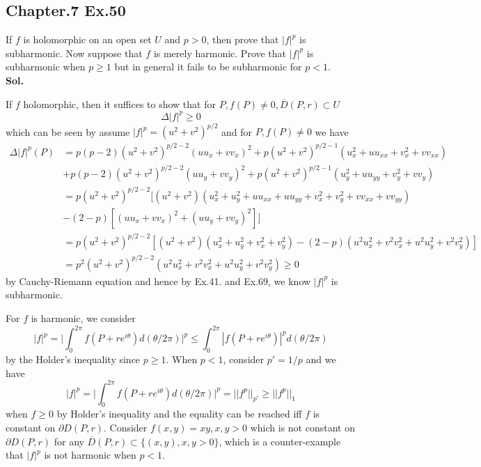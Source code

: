 \documentclass[lang=en,11pt,a4paper,citestyle =authoryear]{elegantpaper}
\begin{document}
\subsection*{Chapter.7 Ex.50} 
If $f$ is holomorphic on an open set $U$ and $p>0$, then prove that $|f|^p$ is subharmonic. Now suppose that $f$ is merely harmonic. Prove that $|f|^p$ is subharmonic when $p\geq 1$ but in general it fails to be subharmonic for $p<1$.
\vspace{0.5em}\\
\textbf{Sol.} \par
If $f$ holomorphic, then it suffices to show that for $P, f(P) \neq 0, \overline{D}(P,r) \subset U$ 
\[\Delta |f|^p \geq 0\]
which can be seen by assume $|f|^p = (u^2+v^2)^{p/2}$ and for $P,f(P)\neq 0$ we have
\[
\begin{aligned}
\Delta |f|^p (P) &= p(p-2)(u^2+v^2)^{p/2-2}(uu_x+vv_x)^2 + p(u^2+v^2)^{p/2-1}(u_x^2+uu_{xx}+v_x^2+vv_{xx}) \\
& + p(p-2)(u^2+v^2)^{p/2-2}(uu_y+vv_y)^2 + p(u^2+v^2)^{p/2-1}(u_y^2+uu_{yy}+v_y^2+vv_{y}) \\
&= p(u^2+v^2)^{p/2-2}[
(u^2+v^2)(u_x^2+u_y^2+uu_{xx}+uu_{yy}+v_x^2+v_y^2+vv_{xx}+vv_{yy}) \\
&-(2-p)[(uu_x+vv_x)^2+(uu_y+vv_y)^2]
] \\
& = p(u^2+v^2)^{p/2-2}[
(u^2+v^2)(u_x^2+u_y^2+v_x^2+v_y^2) - (2-p)(u^2u_x^2+v^2v_x^2+u^2u_y^2+v^2v_y^2)] \\
& = p^2(u^2+v^2)^{p/2-2}(u^2u_x^2+v^2v_x^2+u^2u_y^2+v^2v_y^2) \geq 0
\end{aligned}
\]
by Cauchy-Riemann equation and hence by Ex.41. and Ex.69, we know $|f|^p$ is subharmonic.\par
For $f$ is harmonic, we consider
\[
|f|^p = \Big|\int_0^{2\pi}f(P+re^{i\theta}) d(\theta/2\pi)\Big|^p \leq \int_0^{2\pi} |f(P+re^{i\theta})|^p d(\theta/2\pi)
\]
by the Holder's inequality since $p\geq 1$. When $p<1$, consider $p'  = 1/p$ and we have
\[
|f|^p = \Big|\int_0^{2\pi}f(P+re^{i\theta}) d(\theta/2\pi)\Big|^p = ||f^p||_{p'} \geq ||f^p||_1
\]
when $f\geq 0$ by Holder's inequality and the equality can be reached iff $f$ is constant on $\partial D(P,r)$. Consider $f(x,y) = xy, x,y>0$ which is not constant on $\partial D(P,r)$ for any $\overline{D}(P,r)\subset \{(x,y), x,y>0\}$, which is a counter-example that $|f|^p$ is not harmonic when $p<1$.

\vspace{0.5em}




\addappheadtotoc
\end{document}
